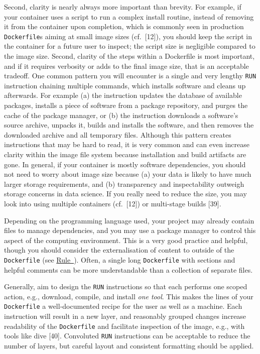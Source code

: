 \documentclass[10pt,letterpaper]{article}
\begin{document}
Second, clarity is nearly always more important than brevity. For
example, if your container uses a script to run a complex install
routine, instead of removing it from the container upon completion,
which is commonly seen in production \texttt{Dockerfile}s aiming at
small image sizes (cf.~{[}12{]}), you should keep the script in the
container for a future user to inspect; the script size is negligible
compared to the image size. Second, clarity of the steps within a
Dockerfile is most important, and if it requires verbosity or adds to
the final image size, that is an acceptable tradeoff. One common pattern
you will encounter is a single and very lengthy \texttt{RUN} instruction
chaining multiple commands, which installs software and cleans up
afterwards. For example (a) the instruction updates the database of
available packages, installs a piece of software from a package
repository, and purges the cache of the package manager, or (b) the
instruction downloads a software's source archive, unpacks it, builds
and installs the software, and then removes the downloaded archive and
all temporary files. Although this pattern creates instructions that may
be hard to read, it is very common and can even increase clarity within
the image file system because installation and build artifacts are gone.
In general, if your container is mostly software dependencies, you
should not need to worry about image size because (a) your data is
likely to have much larger storage requirements, and (b) transparency
and inspectability outweigh storage concerns in data science. If you
really need to reduce the size, you may look into using multiple
containers (cf.~{[}12{]}) or multi-stage builds {[}39{]}.

Depending on the programming language used, your project may already
contain files to manage dependencies, and you may use a package manager
to control this aspect of the computing environment. This is a very good
practice and helpful, though you should consider the externalisation of
content to outside of the \texttt{Dockerfile} (see
\hyperref[{rule:mount}]{Rule~}). Often, a single
long \texttt{Dockerfile} with sections and helpful comments can be more
understandable than a collection of separate files.

Generally, aim to design the \texttt{RUN} instructions so that each
performs one scoped action, e.g., download, compile, and install
\emph{one tool}. This makes the lines of your \texttt{Dockerfile} a
well-documented recipe for the user as well as a machine. Each
instruction will result in a new layer, and reasonably grouped changes
increase readability of the \texttt{Dockerfile} and facilitate
inspection of the image, e.g., with tools like dive {[}40{]}. Convoluted
\texttt{RUN} instructions can be acceptable to reduce the number of
layers, but careful layout and consistent formatting should be applied.
\end{document}
